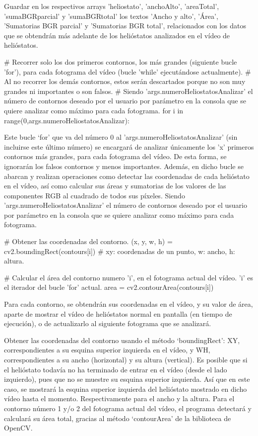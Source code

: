     Guardar en los respectivos arrays 'heliostato', 'anchoAlto', 'areaTotal', 'sumaBGRparcial' y 'sumaBGRtotal' los textos 'Ancho y alto', 'Área', 'Sumatorias BGR parcial' y 'Sumatorias BGR total', relacionados con los datos que se obtendrán más adelante de los helióstatos analizados en el vídeo de helióstatos.


    \# Recorrer solo los dos primeros contornos, los más grandes (siguiente bucle 'for'), para cada fotograma del vídeo (bucle 'while' ejecutándose actualmente).
    \# Al no recorrer los demás contornos, estos serán descartados porque no son muy grandes ni importantes o son falsos.
    \# Siendo 'args.numeroHeliostatosAnalizar' el número de contornos deseado por el usuario por parámetro en la consola que se quiere analizar como máximo para cada fotograma.
    for i in range(0,args.numeroHeliostatosAnalizar):

Este bucle ‘for’ que va del número 0 al 'args.numeroHeliostatosAnalizar' (sin incluirse este último número) se encargará de analizar únicamente los 'x' primeros contornos más grandes, para cada fotograma del vídeo. De esta forma, se ignorarán los falsos contornos y menos importantes. Además, en dicho bucle se abarcan y realizan operaciones como detectar las coordenadas de cada helióstato en el vídeo, así como calcular sus áreas y sumatorias de los valores de las componentes RGB al cuadrado de todos sus píxeles. Siendo 'args.numeroHeliostatosAnalizar' el número de contornos deseado por el usuario por parámetro en la consola que se quiere analizar como máximo para cada fotograma.
        
        
        \# Obtener las coordenadas del contorno.
        (x, y, w, h) = cv2.boundingRect(contours[i]) \# xy: coordenadas de un punto, w: ancho, h: altura.

        \# Calcular el área del contorno numero 'i', en el fotograma actual del vídeo. 'i' es el iterador del bucle 'for' actual.
        area = cv2.contourArea(contours[i])
        
Para cada contorno, se obtendrán sus coordenadas en el vídeo, y su valor de área, aparte de mostrar el vídeo de helióstatos normal en pantalla (en tiempo de ejecución), o de actualizarlo al siguiente fotograma que se analizará.

Obtener las coordenadas del contorno usando el método ‘boundingRect’: XY, correspondientes a su esquina superior izquierda en el vídeo, y WH, correspondientes a su ancho (horizontal) y su altura (vertical). Es posible que si el helióstato todavía no ha terminado de entrar en el vídeo (desde el lado izquierdo), pues que no se muestre su esquina superior izquierda. Así que en este caso, se mostrará la esquina superior izquierda del helióstato mostrado en dicho vídeo hasta el momento. Respectivamente para el ancho y la altura.
Para el contorno número 1 y/o 2 del fotograma actual del vídeo, el programa detectará y calculará su área total, gracias al método ‘contourArea’ de la biblioteca de OpenCV.


